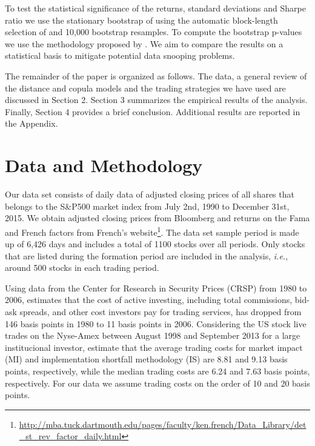 \documentclass[a4paper,12pt]{report}
\begin{document}
	To test the statistical significance of the returns, standard deviations and Sharpe ratio we use the stationary bootstrap of \citet*{pr94} using the automatic block-length selection of \citet*{pw04} and 10,000 bootstrap resamples. To compute the bootstrap p-values we use the methodology proposed by \citet*{lw08}. We aim to compare the results on a statistical basis to mitigate potential data snooping problems.
	
	The remainder of the paper is organized as follows. The data, a general review of the distance and copula models and the trading strategies we have used are discussed in Section 2. Section 3 summarizes the empirical results of the analysis. Finally, Section 4 provides a brief conclusion. Additional results are reported in the Appendix.
	
	\section{Data and Methodology}
	
Our data set consists of daily data of adjusted closing prices of all shares that belongs to the S\&P500 market index from July 2nd, 1990 to December 31st, 2015. We obtain adjusted closing prices from Bloomberg and returns on the Fama and French factors from French's website\footnote{\url{http://mba.tuck.dartmouth.edu/pages/faculty/ken.french/Data_Library/det_st_rev_factor_daily.html}}. The data set sample period is made up of 6,426 days and includes a total of 1100 stocks over all periods. Only stocks that are listed during the formation period are included in the analysis, \emph{i.e.}, around 500 stocks in each trading period.


Using data from the Center for Research in Security Prices (CRSP) from 1980 to 2006, \citet*{french2008} estimates that the cost of active investing, including total commissions, bid-ask spreads, and other cost investors pay for trading services, has dropped from 146 basis points in 1980 to 11 basis points in 2006. Considering the US stock live trades on the Nyse-Amex between August 1998 and September 2013 for a large institucional investor, \citet*{fim15} estimate that the average trading costs for market impact (MI) and implementation shortfall methodology (IS) are 8.81 and 9.13 basis points, respectively, while the median trading costs are 6.24 and 7.63 basis points, respectively. For our data we assume trading costs on the order of 10 and 20 basis points.
	
	\vspace{0.6cm}
	
\end{document}
